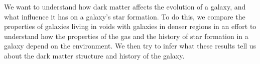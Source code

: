 We want to understand how dark matter affects the evolution of a galaxy, and 
what influence it has on a galaxy's star formation.  To do this, we compare the 
properties of galaxies living in voids with galaxies in denser regions in an 
effort to understand how the properties of the gas and the history of star 
formation in a galaxy depend on the environment.  We then try to infer what 
these results tell us about the dark matter structure and history of the galaxy.